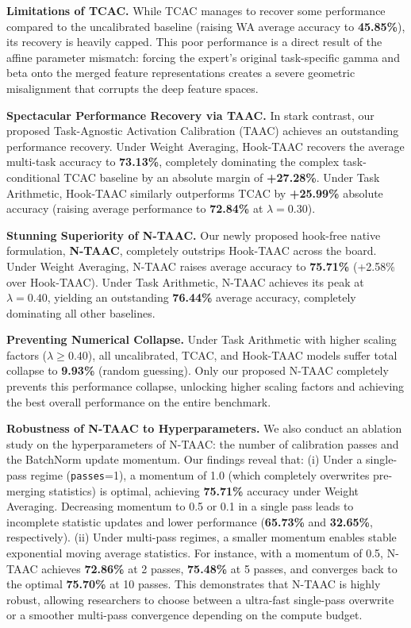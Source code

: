 \documentclass{article}
\theoremstyle{plain}
\theoremstyle{definition}
\theoremstyle{remark}
\begin{document}
\textbf{Limitations of TCAC.} While TCAC manages to recover some performance compared to the uncalibrated baseline (raising WA average accuracy to \textbf{45.85\%}), its recovery is heavily capped. This poor performance is a direct result of the affine parameter mismatch: forcing the expert's original task-specific gamma and beta onto the merged feature representations creates a severe geometric misalignment that corrupts the deep feature spaces.

\textbf{Spectacular Performance Recovery via TAAC.} In stark contrast, our proposed Task-Agnostic Activation Calibration (TAAC) achieves an outstanding performance recovery. Under Weight Averaging, Hook-TAAC recovers the average multi-task accuracy to \textbf{73.13\%}, completely dominating the complex task-conditional TCAC baseline by an absolute margin of \textbf{+27.28\%}. Under Task Arithmetic, Hook-TAAC similarly outperforms TCAC by \textbf{+25.99\%} absolute accuracy (raising average performance to \textbf{72.84\%} at $\lambda = 0.30$).

\textbf{Stunning Superiority of N-TAAC.} Our newly proposed hook-free native formulation, \textbf{N-TAAC}, completely outstrips Hook-TAAC across the board. Under Weight Averaging, N-TAAC raises average accuracy to \textbf{75.71\%} (+2.58\% over Hook-TAAC). Under Task Arithmetic, N-TAAC achieves its peak at $\lambda = 0.40$, yielding an outstanding \textbf{76.44\%} average accuracy, completely dominating all other baselines.

\textbf{Preventing Numerical Collapse.} Under Task Arithmetic with higher scaling factors ($\lambda \ge 0.40$), all uncalibrated, TCAC, and Hook-TAAC models suffer total collapse to \textbf{9.93\%} (random guessing). Only our proposed N-TAAC completely prevents this performance collapse, unlocking higher scaling factors and achieving the best overall performance on the entire benchmark.

\textbf{Robustness of N-TAAC to Hyperparameters.} We also conduct an ablation study on the hyperparameters of N-TAAC: the number of calibration passes and the BatchNorm update momentum. Our findings reveal that: (i) Under a single-pass regime (\texttt{passes}=1), a momentum of 1.0 (which completely overwrites pre-merging statistics) is optimal, achieving \textbf{75.71\%} accuracy under Weight Averaging. Decreasing momentum to 0.5 or 0.1 in a single pass leads to incomplete statistic updates and lower performance (\textbf{65.73\%} and \textbf{32.65\%}, respectively). (ii) Under multi-pass regimes, a smaller momentum enables stable exponential moving average statistics. For instance, with a momentum of 0.5, N-TAAC achieves \textbf{72.86\%} at 2 passes, \textbf{75.48\%} at 5 passes, and converges back to the optimal \textbf{75.70\%} at 10 passes. This demonstrates that N-TAAC is highly robust, allowing researchers to choose between a ultra-fast single-pass overwrite or a smoother multi-pass convergence depending on the compute budget.
\end{document}
